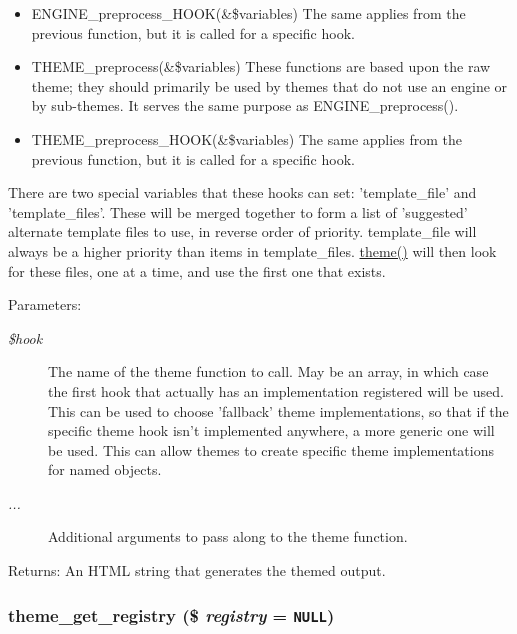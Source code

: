 \begin{itemize}
\item ENGINE\_\-preprocess\_\-HOOK(\&\$variables) The same applies from the previous function, but it is called for a specific hook.\end{itemize}


\begin{itemize}
\item THEME\_\-preprocess(\&\$variables) These functions are based upon the raw theme; they should primarily be used by themes that do not use an engine or by sub-themes. It serves the same purpose as ENGINE\_\-preprocess().\end{itemize}


\begin{itemize}
\item THEME\_\-preprocess\_\-HOOK(\&\$variables) The same applies from the previous function, but it is called for a specific hook.\end{itemize}


There are two special variables that these hooks can set: 'template\_\-file' and 'template\_\-files'. These will be merged together to form a list of 'suggested' alternate template files to use, in reverse order of priority. template\_\-file will always be a higher priority than items in template\_\-files. \hyperlink{includes_2theme_8inc_0512a0a56fd1e056cb48bcb694fa8b12}{theme()} will then look for these files, one at a time, and use the first one that exists. \begin{Desc}
\item[Parameters:]
\begin{description}
\item[{\em \$hook}]The name of the theme function to call. May be an array, in which case the first hook that actually has an implementation registered will be used. This can be used to choose 'fallback' theme implementations, so that if the specific theme hook isn't implemented anywhere, a more generic one will be used. This can allow themes to create specific theme implementations for named objects. \item[{\em ...}]Additional arguments to pass along to the theme function. \end{description}
\end{Desc}
\begin{Desc}
\item[Returns:]An HTML string that generates the themed output. \end{Desc}
\hypertarget{includes_2theme_8inc_d28a6d2c5a667d0d6ae7634329d1aa92}{
\subsubsection[{theme\_\-get\_\-registry}]{\setlength{\rightskip}{0pt plus 5cm}theme\_\-get\_\-registry (\$ {\em registry} = {\tt NULL})}}
\label{includes_2theme_8inc_d28a6d2c5a667d0d6ae7634329d1aa92}



